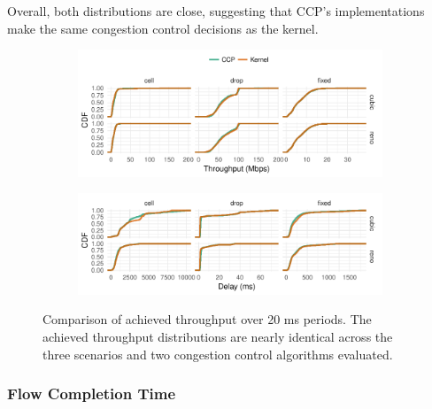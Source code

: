 Overall, both distributions are close, suggesting that CCP's implementations make the same congestion control decisions as the kernel.

\begin{figure}[t]
\centering
\begin{subfigure}{\columnwidth}
\includegraphics[width=\columnwidth]{img/throughput-cdf}
\label{fig:eval:fidelity:tput-cdf}
\end{subfigure}
%
\begin{subfigure}{\columnwidth}
\includegraphics[width=\columnwidth]{img/delay-cdf}
\label{fig:eval:fidelity:delay-cdf}
\end{subfigure}
%
\caption{Comparison of achieved throughput over 20 ms periods. The achieved throughput distributions are nearly identical across the three scenarios and two congestion control algorithms evaluated.}\label{fig:eval:fidelity:cdfs}
\end{figure}

\subsubsection{Flow Completion Time}
\label{sec:eval:fidelity:fct}

